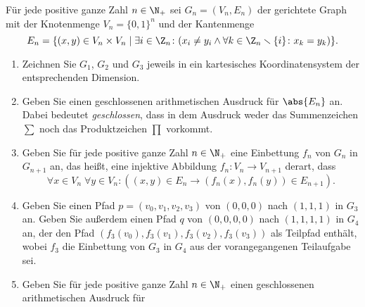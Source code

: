 \documentclass[12pt]{article}
\begin{document}


\begin{aufgabe}[2 + 2 + 2 + 2 + 1 + 2  = 11]
  Für jede positive ganze Zahl $n \in \N_+$ sei $G_n = (V_n, E_n)$ der gerichtete Graph mit der Knotenmenge $V_n = \{0, 1\}^n$ und der Kantenmenge
  \begin{equation*}
    E_n = \{ (x, y) \in V_n \times V_n \mid \exists i \in \Z_n \colon (x_i \neq y_i \land \forall k \in \Z_n \smallsetminus \{i\} \colon x_k = y_k) \}.
  \end{equation*}
  \begin{enumerate}
    \item Zeichnen Sie $G_1$, $G_2$ und $G_3$ jeweils in ein kartesisches Koordinatensystem der entsprechenden Dimension.
    \item Geben Sie einen geschlossenen arithmetischen Ausdruck für $\abs{E_n}$ an. Dabei bedeutet \emph{geschlossen}, dass in dem Ausdruck weder das Summenzeichen $\sum$ noch das Produktzeichen $\prod$ vorkommt.
    \item Geben Sie für jede positive ganze Zahl $n \in \N_+$ eine Einbettung $f_n$ von $G_n$ in $G_{n + 1}$ an, das heißt, eine injektive Abbildung $f_n \colon V_n \to V_{n + 1}$ derart, dass
          \begin{equation*}
            \forall x \in V_n\; \forall y \in V_n \colon \left( (x, y) \in E_n \rightarrow (f_n(x), f_n(y)) \in E_{n + 1} \right).
          \end{equation*}
    \item Geben Sie einen Pfad $p = (v_0, v_1, v_2, v_3)$ von $(0,0,0)$ nach $(1,1,1)$ in $G_3$ an. Geben Sie außerdem einen Pfad $q$ von $(0,0,0,0)$ nach $(1,1,1,1)$ in $G_4$ an, der den Pfad $(f_3(v_0), f_3(v_1), f_3(v_2), f_3(v_3))$ als Teilpfad enthält, wobei $f_3$ die Einbettung von $G_3$ in $G_4$ aus der vorangegangenen Teilaufgabe sei.
    \item Geben Sie für jede positive ganze Zahl $n \in \N_+$ einen geschlossenen arithmetischen Ausdruck für

\end{enumerate}
\end{aufgabe}
\end{document}
